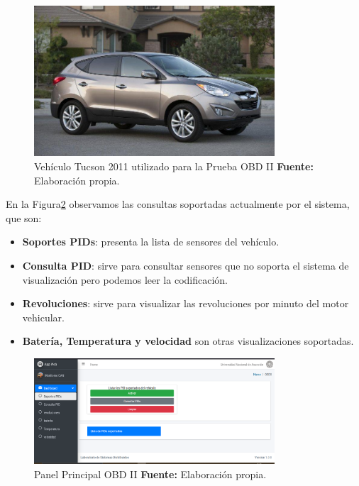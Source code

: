 \begin{figure}[H]
	\centering
	\includegraphics[width=0.8\textwidth]{./Cap6imagen/tucson_fig_c6.jpg}
	\caption [Vehículo Tucson 2011 utilizado para la Prueba OBD II.]{Vehículo Tucson 2011 utilizado para la Prueba OBD II \textbf{ Fuente:} %
		Elaboración propia.}
	\label{tucson_ref_c6} %
\end{figure}

En la Figura\ref{panel_ref_c6} observamos las consultas soportadas actualmente por el sistema, que son:
\begin{itemize}
    \item \textbf{Soportes PIDs}: presenta la lista de sensores del vehículo. 
    \item \textbf{Consulta PID}: sirve para consultar sensores que no soporta el sistema de visualización pero podemos leer la codificación. 
    \item \textbf{Revoluciones}: sirve para visualizar las revoluciones por minuto del motor vehicular.
    \item \textbf{Batería, Temperatura y velocidad} son otras visualizaciones soportadas.     
\end{itemize}



\begin{figure}[H]
	\centering
	\includegraphics[width=0.8\textwidth]{./Cap6imagen/soportes_fig_c6.png}
	\caption [Panel Principal OBD II.]{Panel Principal OBD II \textbf{ Fuente:} %
		Elaboración propia.}
	\label{panel_ref_c6} %
\end{figure}


